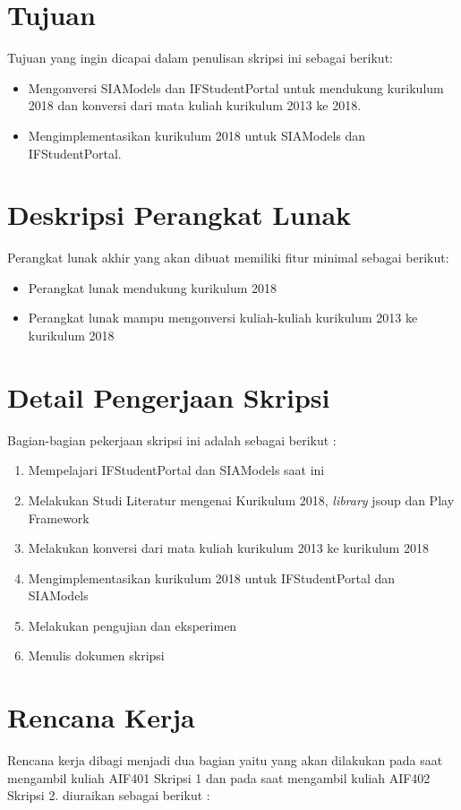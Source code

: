 \documentclass[a4paper,twoside]{article}
\begin{document}
\section{Tujuan}
Tujuan yang ingin dicapai dalam penulisan skripsi ini sebagai berikut:
\begin{itemize}
	\item Mengonversi SIAModels dan IFStudentPortal untuk mendukung kurikulum 2018 dan konversi dari mata kuliah kurikulum 2013 ke 2018.
	\item Mengimplementasikan kurikulum 2018 untuk SIAModels dan IFStudentPortal.
\end{itemize}

\section{Deskripsi Perangkat Lunak}
Perangkat lunak akhir yang akan dibuat memiliki fitur minimal sebagai berikut:
\begin{itemize}
	\item Perangkat lunak mendukung kurikulum 2018
	\item Perangkat lunak mampu mengonversi kuliah-kuliah kurikulum 2013 ke kurikulum 2018
\end{itemize}

\section{Detail Pengerjaan Skripsi}
Bagian-bagian pekerjaan skripsi ini adalah sebagai berikut :
	\begin{enumerate}
		\item Mempelajari IFStudentPortal dan SIAModels saat ini
		\item Melakukan Studi Literatur mengenai Kurikulum 2018, \textit{library} jsoup  dan Play Framework
		\item Melakukan konversi dari mata kuliah kurikulum 2013 ke kurikulum 2018 
		\item Mengimplementasikan kurikulum 2018 untuk IFStudentPortal dan SIAModels
		\item Melakukan pengujian dan eksperimen
		\item Menulis dokumen skripsi
	\end{enumerate}

\section{Rencana Kerja}
Rencana kerja dibagi menjadi dua bagian yaitu yang akan dilakukan pada saat mengambil kuliah AIF401 Skripsi 1 dan pada saat mengambil kuliah AIF402 Skripsi 2. diuraikan sebagai berikut :
\end{document}
